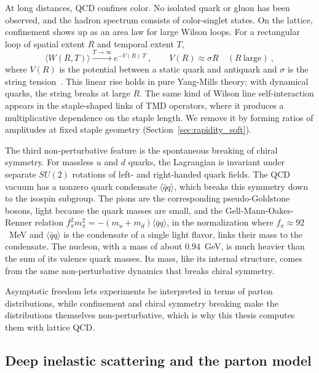 At long distances, QCD confines color. No isolated quark or gluon has been observed, and the hadron spectrum consists of color-singlet states. On the lattice, confinement shows up as an area law for large Wilson loops. For a rectangular loop of spatial extent $R$ and temporal extent $T$,
\begin{equation}
  \langle W(R,T)\rangle \xrightarrow{T\to\infty} e^{-V(R)\,T} \ ,\qquad V(R) \approx \sigma R \quad (R\ \text{large}) \ ,
\end{equation}
where $V(R)$ is the potential between a static quark and antiquark and $\sigma$ is the string tension~\cite{Wilson:1974sk,Creutz:1980zw}. This linear rise holds in pure Yang-Mills theory; with dynamical quarks, the string breaks at large $R$.
The same kind of Wilson line self-interaction appears in the staple-shaped links of TMD operators, where it produces a multiplicative dependence on the staple length. We remove it by forming ratios of amplitudes at fixed staple geometry (Section~\ref{sec:rapidity_soft}).

The third non-perturbative feature is the spontaneous breaking of chiral symmetry. For massless $u$ and $d$ quarks, the Lagrangian is invariant under separate $SU(2)$ rotations of left- and right-handed quark fields. The QCD vacuum has a nonzero quark condensate $\langle\bar{q}q\rangle$, which breaks this symmetry down to the isospin subgroup. The pions are the corresponding pseudo-Goldstone bosons, light because the quark masses are small, and the Gell-Mann-Oakes-Renner relation $f_\pi^2 m_\pi^2 = -(m_u+m_d)\langle\bar{q}q\rangle$, in the normalization where $f_\pi\approx 92$~MeV and $\langle\bar qq\rangle$ is the condensate of a single light flavor, links their mass to the condensate. The nucleon, with a mass of about $0.94$~GeV, is much heavier than the sum of its valence quark masses. Its mass, like its internal structure, comes from the same non-perturbative dynamics that breaks chiral symmetry.

Asymptotic freedom lets experiments be interpreted in terms of parton distributions, while confinement and chiral symmetry breaking make the distributions themselves non-perturbative, which is why this thesis computes them with lattice QCD.

\subsection{Deep inelastic scattering and the parton model}
\label{sec:dis}

